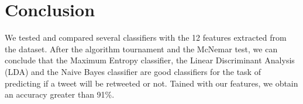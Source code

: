 \section{Conclusion}
\label{sec:conclusion}

We tested and compared several classifiers with the 12 features extracted from 
the dataset. After the algorithm tournament and the McNemar test, we can 
conclude that the Maximum Entropy classifier, the Linear Discriminant Analysis 
(LDA) and the Naive Bayes classifier are good classifiers for the task of 
predicting if a tweet will be retweeted or not. Tained with our features, we 
obtain an accuracy greater than 91\%. 
